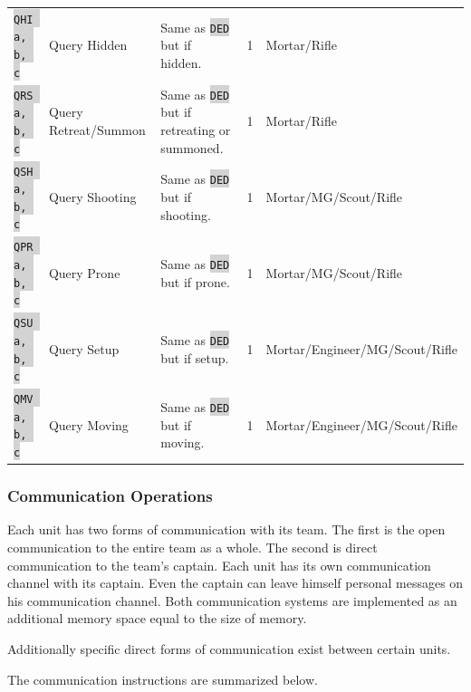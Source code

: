 \documentclass{article}
\newcommand{\vnscode}[1]{\colorbox{lightgray}{\lstinline[language=vns]{#1}}}
\begin{document}
\begin{minipage}{\textwidth}
\begin{tabular}{lllll}
    \vnscode{QHI a, b, c} & Query Hidden & Same as \vnscode{DED} but if hidden. & 1 & Mortar/Rifle \\
    \vnscode{QRS a, b, c} & Query Retreat/Summon & Same as \vnscode{DED} but if retreating or summoned. & 1 & Mortar/Rifle \\
    \vnscode{QSH a, b, c} & Query Shooting & Same as \vnscode{DED} but if shooting. & 1 & Mortar/MG/Scout/Rifle \\
    \vnscode{QPR a, b, c} & Query Prone & Same as \vnscode{DED} but if prone. & 1 & Mortar/MG/Scout/Rifle \\
    \vnscode{QSU a, b, c} & Query Setup & Same as \vnscode{DED} but if setup. & 1 & Mortar/Engineer/MG/Scout/Rifle \\
    \vnscode{QMV a, b, c} & Query Moving & Same as \vnscode{DED} but if moving. & 1 & Mortar/Engineer/MG/Scout/Rifle \\
\end{tabular}
\end{minipage}

\subsubsection{Communication Operations}

Each unit has two forms of communication with its team. The first is the open
communication to the entire team as a whole. The second is direct communication
to the team's captain. Each unit has its own communication channel with its
captain. Even the captain can leave himself personal messages on his
communication channel. Both communication systems are implemented as an
additional memory space equal to the size of memory.

Additionally specific direct forms of communication exist between certain units.

The communication instructions are summarized below.
\end{document}
